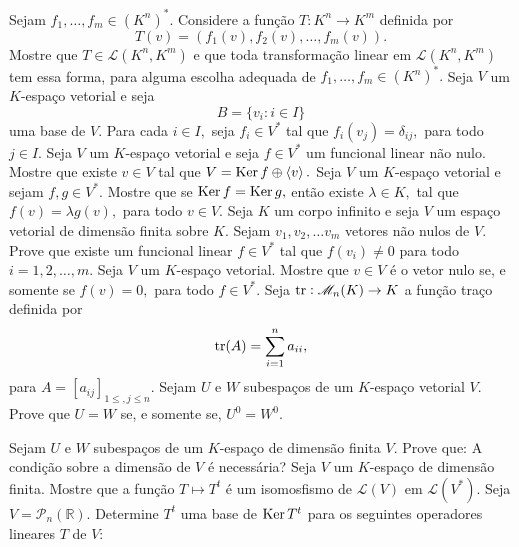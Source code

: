 \documentclass[11pt,a4paper]{article}
\begin{document}
\solucao{}
 Sejam $f_1, \ldots , f_m \in (K^n)^{*}.$ Considere a função $T \colon K^n \to K^m$ definida por
\[T(v) = (f_1(v), f_2(v), \ldots,f_m(v)). \]
Mostre que $T \in \mathcal{L}(K^n, K^m)$ e que toda transformação linear em $\mathcal{L}(K^n, K^m)$ tem essa forma, para alguma escolha adequada de $f_1, \ldots , f_m \in (K^n)^{*}.$
\solucao{}
 Seja $V$ um $K$-espaço vetorial e seja \[B = \{v_i
: i \in I\}\] uma base de $V$. Para cada $i \in I,$ seja $f_i \in V^*$ tal que $f_i(v_j) = \delta_{ij},$ para todo $j \in I.$
\solucao{}
 Seja $V$ um $K$-espaço vetorial e seja $f \in V^{*}$ um funcional linear não nulo. Mostre que existe $v \in V$ tal que $V = \operatorname{Ker} f \oplus \left\langle v \right\rangle.$
\solucao{}
 Seja $V$ um $K$-espaço vetorial e sejam $f,g \in V^{*}.$ Mostre que se $\operatorname{Ker} f = \operatorname{Ker} g,$ então existe $\lambda \in K,$ tal que $f(v) = \lambda g(v),$ para todo $v \in V.$ 
\solucao{}
 Seja $K$ um corpo infinito e seja $V$ um espaço vetorial de dimensão finita sobre $K.$ Sejam $v_1, v_2, \ldots v_m$ vetores não nulos de $V.$ Prove que existe um funcional linear $f \in V^{*}$ tal que $f(v_i)\neq 0$ para todo $i = 1, 2, \ldots ,m.$ 
\solucao{}
 Seja $V$ um $K$-espaço vetorial. Mostre que $v \in V$ é o vetor nulo se, e somente se $f(v) = 0,$ para todo $f \in V^{*}.$
\solucao{}
 Seja $\mathrm{tr }: \mathcal{M}_n(K) \to K$ a função traço definida por
\[
\mathrm{tr }(A) = \displaystyle\sum\limits_{i=1}^n a_{ii},
\]
para $A = [a_{ij}]_{1\le,j\le n}$.
\solucao{}
 Sejam $U$ e $W$ subespaços de um $K$-espaço vetorial $V$. Prove que $U = W$ se, e somente se, $U^{0} = W^{0}.$

\solucao{}
 Sejam $U$ e $W$ subespaços de um $K$-espaço de dimensão finita $V$. Prove que: 
A condição sobre a dimensão de $V$ é necessária?
\solucao{}
 Seja $V$ um $K$-espaço de dimensão finita. Mostre que a função $T \mapsto T^t$ é um isomosfismo de $\mathcal{L}(V)$ em $\mathcal{L}(V^{*}).$
\solucao{}
 Seja $V = \mathcal{P}_n(\mathbb{R}).$ Determine $T^t$ uma base de $\operatorname{Ker} T^t$ para os seguintes operadores lineares $T$ de $V:$
\solucao{}
\end{document}
